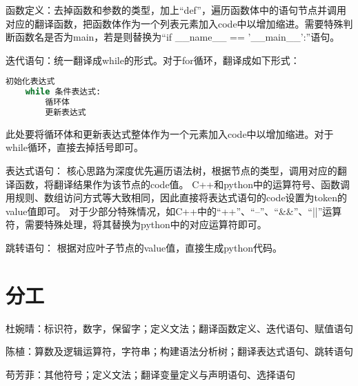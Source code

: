 \documentclass{article}
\begin{document}
函数定义：去掉函数和参数的类型，加上“def”，遍历函数体中的语句节点并调用对应的翻译函数，把函数体作为一个列表元素加入code中以增加缩进。需要特殊判断函数名是否为main，若是则替换为“if \_\_name\_\_ == '\_\_main\_\_':”语句。

迭代语句：统一翻译成while的形式。对于for循环，翻译成如下形式：
\begin{lstlisting}[language=Python]
    初始化表达式
    while 条件表达式:
        循环体
        更新表达式
\end{lstlisting}
此处要将循环体和更新表达式整体作为一个元素加入code中以增加缩进。对于while循环，直接去掉括号即可。

表达式语句：
核心思路为深度优先遍历语法树，根据节点的类型，调用对应的翻译函数，将翻译结果作为该节点的code值。
C++和python中的运算符号、函数调用规则、数组访问方式等大致相同，因此直接将表达式语句的code设置为token的value值即可。
对于少部分特殊情况，如C++中的“++”、“--”、“\&\&”、“||”运算符，需要特殊处理，将其替换为python中的对应运算符即可。


跳转语句：
根据对应叶子节点的value值，直接生成python代码。

\section{分工}
杜婉晴：标识符，数字，保留字；定义文法；翻译函数定义、迭代语句、赋值语句

陈植：算数及逻辑运算符，字符串；构建语法分析树；翻译表达式语句、跳转语句

苟芳菲：其他符号；定义文法；翻译变量定义与声明语句、选择语句
\end{document}
